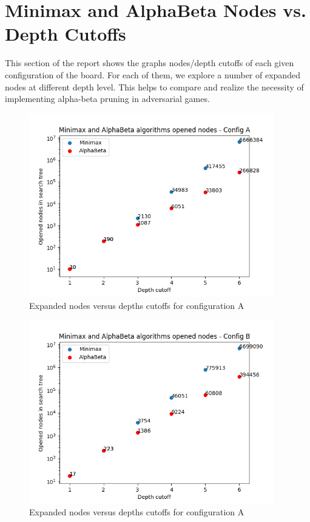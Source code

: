 \documentclass{article}
\begin{document}
\newpage
\section{Minimax and AlphaBeta Nodes vs. Depth Cutoffs}

This section of the report shows the graphs nodes/depth cutoffs of each given configuration of the board. For each of them, we explore a number of expanded nodes at different depth level. This helps to compare and realize the necessity of implementing alpha-beta pruning in adversarial games.
	\begin{figure}[!b]
		\hfill\includegraphics[height=8cm]{configA_nodes_depth.png}\hspace*{\fill}
		\caption{ Expanded nodes versus depths cutoffs for configuration A}
		\label{fig:nodesA}
\newpage
	\end{figure}
		\begin{figure}
		\hfill\includegraphics[height=8cm]{configB_nodes_depth.png}\hspace*{\fill}
		\caption{ Expanded nodes versus depths cutoffs for configuration A}
		\label{fig:nodesB}
	\end{figure}
\end{document}
